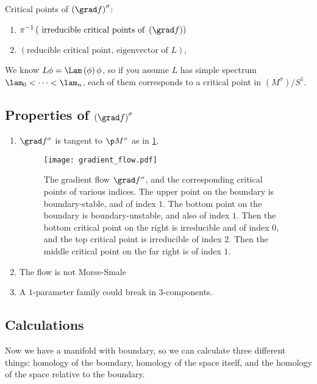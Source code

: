 \documentclass{amsart}
\begin{document}
\begin{rmk}
Critical points of $\left( \grad f \right)^\sigma$:
\begin{enumerate}
\item $\pi^{-1}\left( \text{ irreducible critical points of } \left( \grad f \right)\right)$
\item $\left( \text{reducible critical point, eigenvector of } L \right)$, 
\end{enumerate}
We know $L\phi = \Lam\left( \phi \right)\phi$, so
if you assume $L$ has simple spectrum $\lam_0 < \cdots < \lam_n$, each of them 
corresponds to a critical point in $\left( M^\sigma \right) / S^1$.
\end{rmk}

\subsection{Properties of $\left( \grad f \right)^\sigma$}

\begin{fact}
\begin{enumerate}
\item $\grad f^\sigma$ is tangent to $\p M^\sigma$ as in \cref{fig:gradient_flow}.
\begin{figure}
\texttt{[image: gradient\_flow.pdf]}
\caption{The gradient flow $\grad f^\sigma$, and the corresponding critical points of
various indices. The upper point on the boundary is boundary-stable, and of index $1$. 
The bottom point on the boundary is boundary-unstable, and also of index $1$. 
Then the bottom critical point on the right is irreducible and of index $0$, 
and the top critical point is irreducible of index $2$. 
Then the middle critical point on the far right is of index $1$.}
\label{fig:gradient_flow}
\end{figure}
\item The flow is not Morse-Smale
\item A $1$-parameter family could break in $3$-components.
\end{enumerate}
\end{fact}

\subsection{Calculations}

Now we have a manifold with boundary, so we can calculate three different things:
homology of the boundary, homology of the space itself, and the homology of the space
relative to the boundary.
\end{document}
